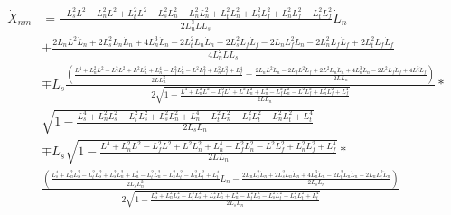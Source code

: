 \documentclass[11pt, landscape]{article}
\begin{document}
\begin{align}
  \dot{X}_{nm} &= \frac{-L_s^2L^2 - L_n^2L^2 + L_t^2L^2 - L_s^2L_{n}^2 - L_n^2L_{n}^2 + L_t^2L_{n}^2 + L_s^2L_{f}^2 + L_n^2L_{f}^2 - L_t^2L_{f}^2}{{2L_n^{3}LL_s}}\dot{L}_n\\ &+ \frac{2L_nL^2\dot{L}_n + 2L_s^2L_{n}\dot{L}_n + 4L_n^3\dot{L}_n - 2L_t^2L_{n}\dot{L}_n - 2L_s^2L_{f}\dot{L}_f - 2L_nL_{f}^2\dot{L}_n - 2L_n^2L_{f}\dot{L}_f + 2L_t^2L_{f}\dot{L}_f}{4L_n^2LL_s}\\
  &\mp L_s\frac{\left(\frac{L^4 + L_n^2L^2 - L_f^2L^2 + L^2L_{n}^2 + L_{n}^4 - L_f^2L_{n}^2 - L^2L_{f}^2 + L_n^2L_{f}^2 + L_{f}^4}{2LL^2_{n}} - \frac{2L_nL^2\dot{L}_n - 2L_fL^2\dot{L}_f + 2L^2L_{n}\dot{L}_n + 4L_{n}^3\dot{L}_n - 2L^2L_{f}\dot{L}_f  + 4L_{f}^3\dot{L}_f}{2LL_{n}}\right)}{2\sqrt{1-\frac{L^4 + L_n^2L^2 - L_f^2L^2 + L^2L_{n}^2 + L_{n}^4 - L_f^2L_{n}^2 - L^2L_{f}^2 + L_n^2L_{f}^2 + L_{f}^4}{2LL_{n}}}}*\\
  &\sqrt{1-\frac{L_{s}^4 + L_n^2L_{s}^2 - L_t^2L_{s}^2 + L_s^2L_{n}^2 + L_{n}^4 - L_t^2L_{n}^2 - L_s^2L_{t}^2 - L_n^2L_{t}^2 + L_{t}^4}{2L_{s}L_{n}}}\\
  &\mp L_s\sqrt{1-\frac{L^4 + L_n^2L^2 - L_f^2L^2 + L^2L_{n}^2 + L_{n}^4 - L_f^2L_{n}^2 - L^2L_{f}^2 + L_n^2L_{f}^2 + L_{f}^4}{2LL_{n}}}*\\
  &\frac{\left(\frac{L_{s}^4 + L_n^2L_{s}^2 - L_t^2L_{s}^2 + L_s^2L_{n}^2 + L_{n}^4 - L_t^2L_{n}^2 - L_s^2L_{t}^2 - L_n^2L_{t}^2 + L_{t}^4}{2L_{s}L^2_{n}}\dot{L}_n
    - \frac{2L_nL_{s}^2\dot{L}_n + 2L_s^2L_{n}\dot{L}_n + 4L_{n}^3\dot{L}_n - 2L_t^2L_{n}\dot{L}_n - 2L_nL_{t}^2\dot{L}_n}{2L_{s}L_{n}}\right)}{2\sqrt{1-\frac{L_{s}^4 + L_n^2L_{s}^2 - L_t^2L_{s}^2 + L_s^2L_{n}^2 + L_{n}^4 - L_t^2L_{n}^2 - L_s^2L_{t}^2 - L_n^2L_{t}^2 + L_{t}^4}{2L_{s}L_{n}}}}\\
\end{align}
\end{document}
